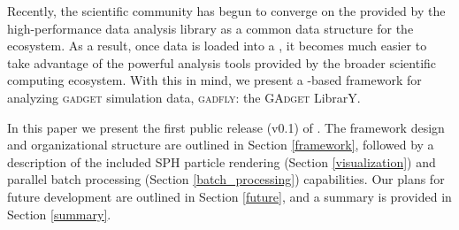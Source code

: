 Recently, the scientific  community has begun to converge on the  provided by the high-performance  data analysis library as a common data structure for the ecosystem. 
As a result, once data is loaded into a , it becomes much easier to take advantage of the powerful analysis tools provided by the broader scientific computing ecosystem.
With this in mind, we present a -based framework for analyzing \textsc{gadget} simulation data, \textsc{gadfly}: the \textsc{GAdget}  LibrarY.

In this paper we present the first public release (v0.1) of . 
The framework design and organizational structure are outlined in Section \ref{framework}, followed by a description of the included SPH particle rendering (Section \ref{visualization}) and parallel batch processing (Section \ref{batch_processing}) capabilities.  Our plans for future development are outlined in Section \ref{future}, and a summary is provided in Section \ref{summary}.



